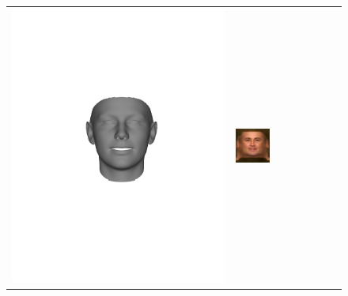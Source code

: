 \begin{figure}[t!]
\begin{center}
\begin{tabular}{ @{\hskip 1.5mm}c@{}c@{\hskip 1.5mm}c@{}c@{}c@{}c@{}c@{\hskip 1.5mm}c@{}}
\includegraphics[trim=150 250 150 250,clip, width=\afifthcolumn]{img/representation/pred_shape_no_Male.pdf} &
\includegraphics[width=\afifthcolumn]{img/representation/pred_tex_Chubby.jpg} &

\end{tabular}
\end{center}
\end{figure}
